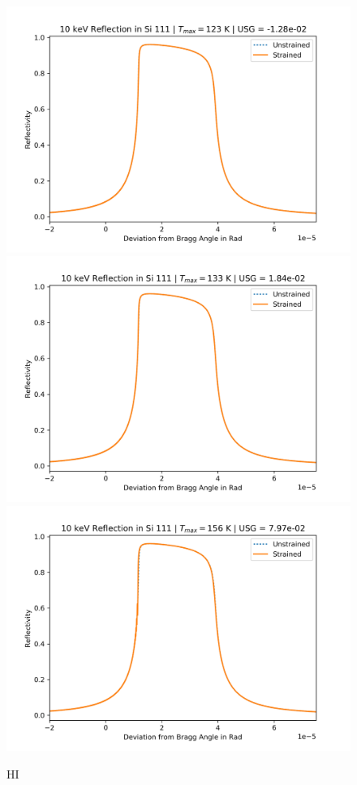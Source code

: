 \documentclass[preprint]{iucr}              %
\begin{document}
\begin{figure}
\caption{HI}
\includegraphics{images/111_10keV_4.png}
\includegraphics{images/111_10keV_5.png}
\includegraphics{images/111_10keV_7.png}

\end{figure}
\end{document}
